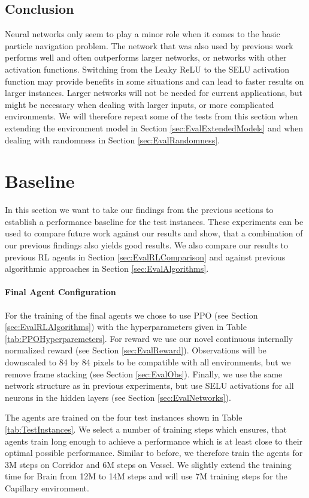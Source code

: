 \subsection{Conclusion} \label{sec:Eval/Networks/Conclusion}
Neural networks only seem to play a minor role when it comes to the basic particle navigation problem. The network that was also used by previous work performs well and often outperforms larger networks, or networks with other activation functions. Switching from the Leaky ReLU to the SELU activation function may provide benefits in some situations and can lead to faster results on larger instances. Larger networks will not be needed for current applications, but might be necessary when dealing with larger inputs, or more complicated environments. We will therefore repeat some of the tests from this section when extending the environment model in Section \ref{sec:EvalExtendedModels} and when dealing with randomness in Section \ref{sec:EvalRandomness}. 

\section{Baseline} \label{sec:EvalBaseline}
In this section we want to take our findings from the previous sections to establish a performance baseline for the test instances. These experiments can be used to compare future work against our results and show, that a combination of our previous findings also yields good results. We also compare our results to previous RL agents in Section \ref{sec:EvalRLComparison} and against previous algorithmic approaches in Section \ref{sec:EvalAlgorithms}.

\paragraph{Final Agent Configuration}
For the training of the final agents we chose to use PPO (see Section \ref{sec:EvalRLAlgorithms}) with the hyperparameters given in Table \ref{tab:PPOHyperparemeters}. For reward we use our novel continuous internally normalized reward (see Section \ref{sec:EvalReward}). Observations will be downscaled to 84 by 84 pixels to be compatible with all environments, but we remove frame stacking (see Section \ref{sec:EvalObs}). Finally, we use the same network structure as in previous experiments, but use SELU activations for all neurons in the hidden layers (see Section \ref{sec:EvalNetworks}).

The agents are trained on the four test instances shown in Table \ref{tab:TestInstances}. We select a number of training steps which ensures, that agents train long enough to achieve a performance which is at least close to their optimal possible performance. Similar to before, we therefore train the agents for 3M steps on Corridor and 6M steps on Vessel. We slightly extend the training time for Brain from 12M to 14M steps and will use 7M training steps for the Capillary environment.


